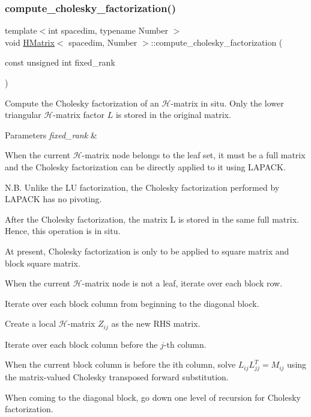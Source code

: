 \subsubsection{\texorpdfstring{compute\+\_\+cholesky\+\_\+factorization()}{compute\_cholesky\_factorization()}\hspace{0.1cm}{\footnotesize\ttfamily [2/2]}}
{\footnotesize\ttfamily template$<$int spacedim, typename Number $>$ \\
void \hyperlink{classHMatrix}{H\+Matrix}$<$ spacedim, Number $>$\+::compute\+\_\+cholesky\+\_\+factorization (\begin{DoxyParamCaption}\item[{const unsigned int}]{fixed\+\_\+rank }\end{DoxyParamCaption})}

Compute the Cholesky factorization of an $\mathcal{H}$-\/matrix in situ. Only the lower triangular $\mathcal{H}$-\/matrix factor $L$ is stored in the original matrix.


\begin{DoxyParams}{Parameters}
{\em fixed\+\_\+rank} & \\
\hline
\end{DoxyParams}
When the current $\mathcal{H}$-\/matrix node belongs to the leaf set, it must be a full matrix and the Cholesky factorization can be directly applied to it using L\+A\+P\+A\+CK.

N.\+B. Unlike the LU factorization, the Cholesky factorization performed by L\+A\+P\+A\+CK has no pivoting.

After the Cholesky factorization, the matrix {\ttfamily L} is stored in the same full matrix. Hence, this operation is in situ.

At present, Cholesky factorization is only to be applied to square matrix and block square matrix.

When the current $\mathcal{H}$-\/matrix node is not a leaf, iterate over each block row.

Iterate over each block column from beginning to the diagonal block.

Create a local $\mathcal{H}$-\/matrix $Z_{ij}$ as the new R\+HS matrix.

Iterate over each block column before the $j$-\/th column.

When the current block column is before the i\textquotesingle{}th column, solve $L_{ij} L_{jj}^T = M_{ij}$ using the matrix-\/valued Cholesky transposed forward substitution.

When coming to the diagonal block, go down one level of recursion for Cholesky factorization.

